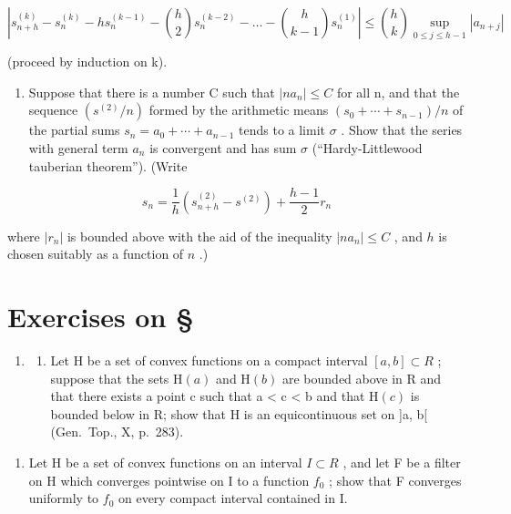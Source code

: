 \[
\left| s _ {n + h} ^ {(k)} - s _ {n} ^ {(k)} - h s _ {n} ^ {(k - 1)} - \binom {h} {2} s _ {n} ^ {(k - 2)} - \dots - \binom {h} {k - 1} s _ {n} ^ {(1)} \right| \leqslant \binom {h} {k} \sup _ {0 \leqslant j \leqslant h - 1} | a _ {n + j} |
\]

(proceed by induction on k).

\begin{enumerate}
\def\labelenumi{\alph{enumi})}
\setcounter{enumi}{1}
\tightlist
\item
  Suppose that there is a number C such that \(|na_{n}| \leqslant C\) for all n, and that the sequence \((s^{(2)}/n)\) formed by the arithmetic means \((s_{0} + \cdots + s_{n-1})/n\) of the partial sums \(s_{n} = a_{0} + \cdots + a_{n-1}\) tends to a limit \(\sigma\) . Show that the series with general term \(a_{n}\) is convergent and has sum \(\sigma\) (``Hardy-Littlewood tauberian theorem''). (Write
\end{enumerate}

\[
s _ {n} = \frac {1}{h} \left(s _ {n + h} ^ {(2)} - s ^ {(2)}\right) + \frac {h - 1}{2} r _ {n}
\]

where \(|r_n|\) is bounded above with the aid of the inequality \(|na_n| \leqslant C\) , and \(h\) is chosen suitably as a function of \(n\) .)

\setcounter{exercisegroup}{3}
\section*{Exercises on \S{}}
{}

\begin{enumerate}
\def\labelenumi{\arabic{enumi})}
\tightlist
\item
  \begin{enumerate}
  \def\labelenumii{\alph{enumii})}
  \tightlist
  \item
    Let H be a set of convex functions on a compact interval \([a, b] \subset R\) ; suppose that the sets \(\mathrm{H}(a)\) and \(\mathrm{H}(b)\) are bounded above in R and that there exists a point c such that a \textless{} c \textless{} b and that \(\mathrm{H}(c)\) is bounded below in R; show that H is an equicontinuous set on {]}a, b{[} (Gen.~Top., X, p.~283).
  \end{enumerate}
\end{enumerate}

\begin{enumerate}
\def\labelenumi{\alph{enumi})}
\setcounter{enumi}{1}
\tightlist
\item
  Let H be a set of convex functions on an interval \(I \subset R\) , and let F be a filter on H which converges pointwise on I to a function \(f_{0}\) ; show that F converges uniformly to \(f_{0}\) on every compact interval contained in I.
\end{enumerate}

